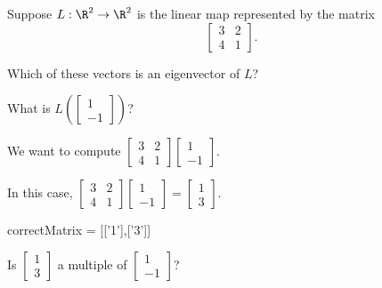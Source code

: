 \documentclass{ximera}
\begin{document}
\begin{question}
  Suppose $L : \R^2 \to \R^2$ is the linear map represented by the matrix
  $$
  \begin{bmatrix}
    3 & 2 \\
    4 & 1
  \end{bmatrix}.
  $$
  
  Which of these vectors is an eigenvector of $L$?
  \begin{solution}
    \begin{hint}
      \begin{question}
        What is $L\left( \begin{bmatrix} 1 \\ -1 \end{bmatrix}\right)$?        

        \begin{solution}
          \begin{hint}
            We want to compute $\begin{bmatrix} 3 & 2 \\ 4 & 1 \end{bmatrix} \begin{bmatrix} 1 \\ -1 \end{bmatrix}$.
          \end{hint}

          \begin{hint}
            In this case, $\begin{bmatrix} 3 & 2 \\ 4 & 1 \end{bmatrix} \begin{bmatrix} 1 \\ -1 \end{bmatrix} = \begin{bmatrix} 1 \\ 3 \end{bmatrix}$.
          \end{hint}

          \begin{matrix-answer}[name=M]
            correctMatrix = [['1'],['3']]
          \end{matrix-answer}
        \end{solution}
        
        Is $\begin{bmatrix} 1 \\ 3 \end{bmatrix}$ a multiple of $\begin{bmatrix} 1 \\ -1 \end{bmatrix}$?


\end{question}
\end{hint}
\end{solution}
\end{question}
\end{document}
